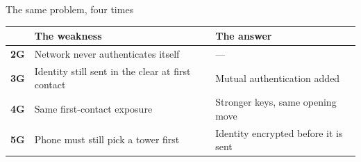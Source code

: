 \begin{frame}{The same problem, four times}
  \vspace{0.4em}
  {\small
  \begin{tabular}{@{}p{}p{}p{}@{}}
    \toprule
    & \textbf{\textcolor{coreorange}{The weakness}} & \textbf{\textcolor{softgreen}{The answer}}\\
    \midrule
    \textbf{2G} & Network never authenticates itself & ---\\[3pt]
    \textbf{3G} & Identity still sent in the clear at first contact & Mutual authentication added\\[3pt]
    \textbf{4G} & Same first-contact exposure & Stronger keys, same opening move\\[3pt]
    \textbf{5G} & Phone must still pick a tower first & Identity encrypted before it is sent\\
    \bottomrule
  \end{tabular}\par}

  \vspace{0.8em}


\end{frame}

